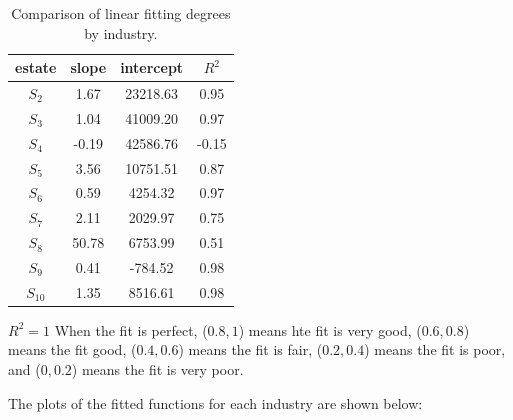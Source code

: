 \documentclass[12pt]{article}  %
\begin{document}
\begin{table}[htbp] %
	\begin{center}
		\caption{Comparison of linear fitting degrees by industry.}
		\label{sanxianbiao}
		\begin{tabular}{c c c c}
			\toprule[2pt]
			\textbf{estate} & \textbf{slope} & \textbf{intercept} & \textbf{$R^2$} \\
			\midrule
			\(S_2\) & 1.67 & 23218.63 & 0.95 \\
			\(S_3\) & 1.04 & 41009.20 & 0.97 \\
			\(S_4\) & -0.19 & 42586.76 & -0.15 \\
			\(S_5\) & 3.56 & 10751.51 & 0.87 \\
			\(S_6\) & 0.59 & 4254.32 & 0.97 \\
			\(S_7\) & 2.11 & 2029.97 & 0.75 \\
			\(S_8\) & 50.78 & 6753.99 & 0.51 \\
			\(S_9\) & 0.41 & -784.52 & 0.98 \\
			\(S_{10}\) & 1.35 & 8516.61 & 0.98 \\
			\bottomrule[2pt]
		\end{tabular}
	\end{center}
\end{table}

	$R^2=1$ When the fit is perfect, ($0.8, 1$) means hte fit is very good, ($0.6, 0.8$) means the fit good, ($0.4, 0.6$) means the fit is fair, ($0.2, 0.4$) means the fit is poor, and ($0, 0.2$) means the fit is very poor.

	The plots of the fitted functions for each industry are shown below:
	
\end{document}
